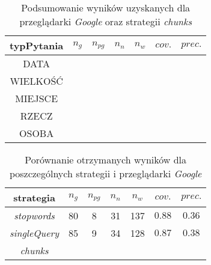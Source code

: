 \begin{table}[h]
	\centering
	\begin{tabular}{|c|c|c|c|c|c|c| }
		
		\hline
		\textbf{typPytania} & $n_g$ &$n_{pg}$&$n_n$&$n_w$&$cov.$&$prec.$  \\ \hline
		DATA&&&&&$\num{}$&$\num{}$ \\ \hline
		WIELKOŚĆ&&&&&$\num{}$&$\num{}$ \\ \hline
		MIEJSCE&&&&&$\num{}$&$\num{}$ \\ \hline
		RZECZ&&&&&$\num{}$&$\num{}$\\ \hline
		OSOBA&&&&&$\num{}$&$\num{}$\\ \hline
	\end{tabular}
	\caption{Podsumowanie wyników uzyskanych dla przeglądarki \textit{Google} oraz strategii \textit{chunks}}
	
	\label{tab:GoogleChunks}
	
\end{table}

\begin{table}[h]
	\centering
	\begin{tabular}{|c|c|c|c|c|c|c| }
		
		\hline
		\textbf{strategia} & $n_g$ &$n_{pg}$&$n_n$&$n_w$&$cov.$&$prec.$  \\ \hline
		\textit{stopwords}&80&8&31&137&$\num{0.88}$&$\num{0.36}$ \\ \hline
		\textit{singleQuery}&85&9&34&128&$\num{0.87}$&$\num{0.38}$ \\ \hline
		\textit{chunks}&&&&&$\num{}$&$\num{}$ \\ \hline
	\end{tabular}
	\caption{Porównanie otrzymanych wyników dla poszczególnych strategii i przeglądarki \textit{Google}}
	
	\label{tab:porownanieStrat}
	
\end{table}